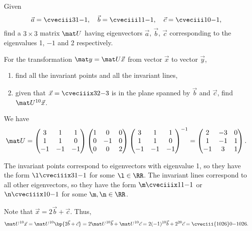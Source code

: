 \begin{problem}
    Given \[\vec a = \cveciii31{-1}, \quad \vec b = \cveciii11{-1}, \quad \vec c = \cveciii10{-1},\] find a $3 \times 3$ matrix $\mat U$ having eigenvectors $\vec a$, $\vec b$, $\vec c$ corresponding to the eigenvalues 1, $-1$ and 2 respectively.

    For the transformation $\mat y = \mat U \vec x$ from vector $\vec x$ to vector $\vec y$,
    \begin{enumerate}
        \item find all the invariant points and all the invariant lines,
        \item given that $\vec x = \cveciiix32{-3}$ is in the plane spanned by $\vec b$ and $\vec c$, find $\mat U^{10} \vec x$.
    \end{enumerate}
\end{problem}
\begin{solution}
    We have \[\mat U = \begin{pmatrix}3 & 1 & 1 \\ 1 & 1 & 0 \\ -1 & - 1 & -1\end{pmatrix} \begin{pmatrix}1 & 0 & 0 \\ 0 & -1 & 0 \\ 0 & 0 & 2\end{pmatrix} \begin{pmatrix}3 & 1 & 1 \\ 1 & 1 & 0 \\ -1 & - 1 & -1\end{pmatrix}^{-1} = \begin{pmatrix}2 & -3 & 0 \\ 1 & -1 & 1 \\ -1 & 3 & 1\end{pmatrix}.\]

    \begin{ppart}
        The invariant points correspond to eigenvectors with eigenvalue 1, so they have the form $\l \cveciiix31{-1}$ for some $\l \in \RR$. The invariant lines correspond to all other eigenvectors, so they have the form $\m \cveciiix11{-1}$ or $\n \cveciiix10{-1}$ for some $\m, \n \in \RR$.
    \end{ppart}
    \begin{ppart}
        Note that $\vec x = 2\vec b + \vec c$. Thus, \[\mat U^{10} \vec x = \mat U^{10} \bp{2\vec b + \vec c} = 2 \mat U^{10} \vec b + \mat U^{10} \vec c = 2 (-1)^{10} \vec b + 2^{20} \vec c = \cveciii{1026}0{-1026}.\]
    \end{ppart}
\end{solution}

